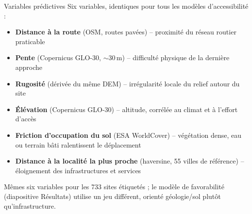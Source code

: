 \documentclass[11pt,aspectratio=169]{beamer}
\newcommand{\source}[1]{{\tiny\color{graytext}#1}}
\begin{document}
\begin{frame}{Variables pr\'edictives}
  Six variables, identiques pour tous les mod\`eles d'accessibilit\'e :
  \vspace{0.2cm}
  \small
  \begin{itemize}
    \setlength\itemsep{0.55em}
    \item \textbf{Distance \`a la route} (OSM, routes pav\'ees) -- proximit\'e du
      r\'eseau routier praticable
    \item \textbf{Pente} (Copernicus GLO-30, $\sim$30\,m) -- difficult\'e physique de
      la derni\`ere approche
    \item \textbf{Rugosit\'e} (d\'eriv\'ee du m\^eme DEM) -- irr\'egularit\'e locale du
      relief autour du site
    \item \textbf{\'El\'evation} (Copernicus GLO-30) -- altitude, corr\'el\'ee au climat
      et \`a l'effort d'acc\`es
    \item \textbf{Friction d'occupation du sol} (ESA WorldCover) -- v\'eg\'etation dense,
      eau ou terrain b\^ati ralentissent le d\'eplacement
    \item \textbf{Distance \`a la localit\'e la plus proche} (haversine, 55 villes de
      r\'ef\'erence) -- \'eloignement des infrastructures et services
  \end{itemize}
  \vfill
  \source{M\^emes six variables pour les 733 sites \'etiquet\'es ; le mod\`ele de
  favorabilit\'e (diapositive R\'esultats) utilise un jeu diff\'erent, orient\'e
  g\'eologie/sol plut\^ot qu'infrastructure.}
\end{frame}
\end{document}
